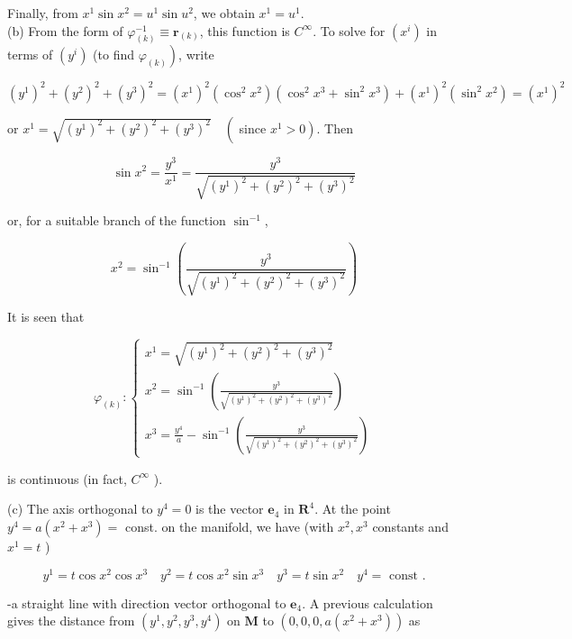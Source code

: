 \documentclass[10pt]{article}
\begin{document}
Finally, from $x^{1} \sin x^{2}=u^{1} \sin u^{2}$, we obtain $x^{1}=u^{1}$.\\
(b) From the form of $\varphi_{(k)}^{-1} \equiv \mathbf{r}_{(k)}$, this function is $C^{\infty}$. To solve for $\left(x^{i}\right)$ in terms of $\left(y^{i}\right)$ (to find $\left.\varphi_{(k)}\right)$, write

$$
\left(y^{1}\right)^{2}+\left(y^{2}\right)^{2}+\left(y^{3}\right)^{2}=\left(x^{1}\right)^{2}\left(\cos ^{2} x^{2}\right)\left(\cos ^{2} x^{3}+\sin ^{2} x^{3}\right)+\left(x^{1}\right)^{2}\left(\sin ^{2} x^{2}\right)=\left(x^{1}\right)^{2}
$$

or $x^{1}=\sqrt{\left(y^{1}\right)^{2}+\left(y^{2}\right)^{2}+\left(y^{3}\right)^{2}} \quad\left(\right.$ since $\left.x^{1}>0\right)$. Then

$$
\sin x^{2}=\frac{y^{3}}{x^{1}}=\frac{y^{3}}{\sqrt{\left(y^{1}\right)^{2}+\left(y^{2}\right)^{2}+\left(y^{3}\right)^{2}}}
$$

or, for a suitable branch of the function $\sin ^{-1}$,

$$
x^{2}=\sin ^{-1}\left(\frac{y^{3}}{\sqrt{\left(y^{1}\right)^{2}+\left(y^{2}\right)^{2}+\left(y^{3}\right)^{2}}}\right)
$$

It is seen that

$$
\varphi_{(k)}:\left\{\begin{array}{l}
x^{1}=\sqrt{\left(y^{1}\right)^{2}+\left(y^{2}\right)^{2}+\left(y^{3}\right)^{2}} \\
x^{2}=\sin ^{-1}\left(\frac{y^{3}}{\sqrt{\left(y^{1}\right)^{2}+\left(y^{2}\right)^{2}+\left(y^{3}\right)^{2}}}\right) \\
x^{3}=\frac{y^{4}}{a}-\sin ^{-1}\left(\frac{y^{3}}{\sqrt{\left(y^{1}\right)^{2}+\left(y^{2}\right)^{2}+\left(y^{3}\right)^{2}}}\right)
\end{array}\right.
$$

is continuous (in fact, $C^{\infty}$ ).

(c) The axis orthogonal to $y^{4}=0$ is the vector $\mathbf{e}_{4}$ in $\mathbf{R}^{4}$. At the point $y^{4}=a\left(x^{2}+x^{3}\right)=$ const. on the manifold, we have (with $x^{2}, x^{3}$ constants and $x^{1}=t$ )

$$
y^{1}=t \cos x^{2} \cos x^{3} \quad y^{2}=t \cos x^{2} \sin x^{3} \quad y^{3}=t \sin x^{2} \quad y^{4}=\text { const } .
$$

-a straight line with direction vector orthogonal to $\mathbf{e}_{4}$. A previous calculation gives the distance from $\left(y^{1}, y^{2}, y^{3}, y^{4}\right)$ on $\mathbf{M}$ to $\left(0,0,0, a\left(x^{2}+x^{3}\right)\right)$ as
\end{document}
